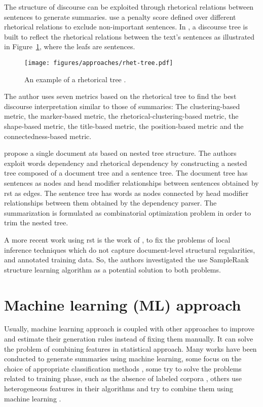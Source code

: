 The structure of discourse can be exploited through rhetorical relations between sentences to generate summaries. 
\citet{94-ono-al} use a penalty score defined over different rhetorical relations to exclude non-important sentences.
In \citep{98-marcu}, a discourse tree is built to reflect the rhetorical relations between the text's sentences as illustrated in Figure~\ref{fig:rhet-tree}, where the leafs are sentences.

\begin{figure}[!ht]
	\begin{center}
		\texttt{[image: figures/approaches/rhet-tree.pdf]} %
		\caption{An example of a rhetorical tree \citep{98-marcu}.}
		\label{fig:rhet-tree}
	\end{center}
\end{figure}
The author uses seven metrics based on the rhetorical tree to find the best discourse interpretation similar to those of summaries: The clustering-based metric, the marker-based metric, the rhetorical-clustering-based metric, the shape-based metric, the title-based metric, the position-based metric and the connectedness-based metric.


\citet{14-kikuchi-al} propose a single document \ac{ats} based on nested tree structure. 
The authors exploit words dependency and rhetorical dependency  by constructing a nested tree composed of a document tree and a sentence tree. 
The document tree has sentences as nodes and head modifier relationships between sentences obtained by \ac{rst} as edges. 
The sentence tree has words as nodes connected by head modifier relationships between them obtained by the dependency parser.
The summarization is formulated as combinatorial optimization problem in order to trim the nested tree.

A more recent work using \ac{rst} is the work of \citet{16-goyal-eisenstein}, to fix the problems of local inference techniques which do not capture document-level structural regularities, and annotated training data.
So, the authors investigated the use SampleRank \citep{11-wick-al} structure learning algorithm as a potential solution to both problems.

\section{Machine learning (ML) approach}

Usually, machine learning approach is coupled with other approaches to improve and estimate their generation rules instead of fixing them manually.
It can solve the problem of combining features in statistical approach.
Many works have been conducted to generate summaries using machine learning, some focus on the choice of appropriate classification methods \citep{95-kupiec-al,02-osborne,05-yeh-al}, some try to solve the problems related to training phase, such as the absence of labeled corpora \citep{02-amini-gallinari}, others use heterogeneous features in their algorithms and try to combine them using machine learning \citep{08-wong-al,10-yatsko-al}. 

